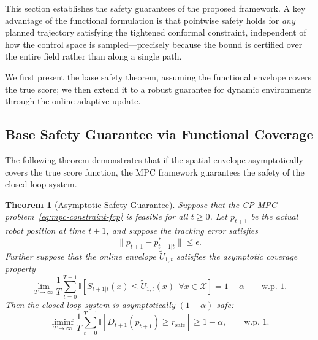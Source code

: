 \documentclass[lettersize,journal]{IEEEtran}
\newtheorem{theorem}{Theorem}
\begin{document}
This section establishes the safety guarantees of the proposed framework.
A key advantage of the functional formulation is that pointwise safety holds for \emph{any} planned trajectory satisfying the tightened conformal constraint, independent of how the control space is sampled---precisely because the bound is certified over the entire field rather than along a single path.

We first present the base safety theorem, assuming the functional envelope covers the true score; we then extend it to a robust guarantee for dynamic environments through the online adaptive update.

\subsection{Base Safety Guarantee via Functional Coverage}

The following theorem demonstrates that if the spatial envelope asymptotically covers the true score function, the MPC framework guarantees the safety of the closed-loop system.

\begin{theorem}[Asymptotic Safety Guarantee]
\label{thm:asymptotic_safety}
Suppose that the CP-MPC problem~\eqref{eq:mpc-constraint-fcp} is feasible for all $t \ge 0$.
Let $p_{t+1}$ be the actual robot position at time $t+1$, and suppose the tracking error satisfies
\[
\|p_{t+1}-p^*_{t+1|t}\| \le \epsilon.
\]
Further suppose that the online envelope $\widetilde U_{1,t}$ satisfies the asymptotic coverage property
\[
\lim_{T\to\infty}\frac{1}{T}\sum_{t=0}^{T-1}
\mathbb I\!\left[
S_{t+1|t}(x)\le \widetilde U_{1,t}(x)\ \ \forall x\in\mathcal X
\right]
=
1-\alpha
\qquad \text{w.p. 1.}
\]
Then the closed-loop system is asymptotically $(1-\alpha)$-safe:
\begin{equation}
\liminf_{T \to \infty}
\frac{1}{T}\sum_{t=0}^{T-1}
\mathbb{I}\!\left[ D_{t+1}(p_{t+1}) \ge r_{\mathrm{safe}} \right]
\ge 1-\alpha,
\qquad \text{w.p. 1.}
\label{eq:asymptotic_safety_guarantee}
\end{equation}
\end{theorem}
\end{document}
